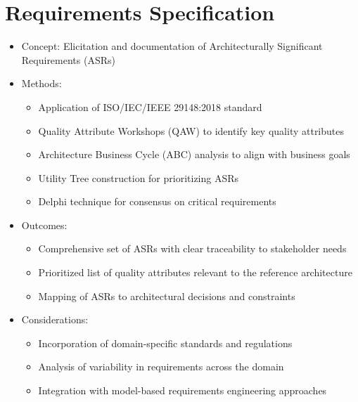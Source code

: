 \documentclass[12pt,a4paper]{article}
\begin{document}
\section{Requirements Specification}
\begin{itemize}
    \item Concept: Elicitation and documentation of Architecturally Significant Requirements (ASRs) \citep{Chen2013}
    \item Methods:
    \begin{itemize}
        \item Application of ISO/IEC/IEEE 29148:2018 standard \citep{ISO29148}
        \item Quality Attribute Workshops (QAW) to identify key quality attributes \citep{Barbacci2003}
        \item Architecture Business Cycle (ABC) analysis to align with business goals \citep{Bass2003}
        \item Utility Tree construction for prioritizing ASRs \citep{Kazman2000}
        \item Delphi technique for consensus on critical requirements \citep{Dalkey1963}
    \end{itemize}
    \item Outcomes:
    \begin{itemize}
        \item Comprehensive set of ASRs with clear traceability to stakeholder needs
        \item Prioritized list of quality attributes relevant to the reference architecture
        \item Mapping of ASRs to architectural decisions and constraints
    \end{itemize}
    \item Considerations:
    \begin{itemize}
        \item Incorporation of domain-specific standards and regulations \citep{Nakagawa2023}
        \item Analysis of variability in requirements across the domain \citep{Galster2014}
        \item Integration with model-based requirements engineering approaches \citep{Mavin2009}
    \end{itemize}
\end{itemize}
\end{document}
